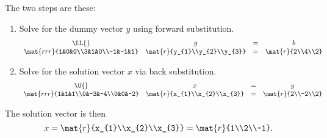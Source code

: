 The two steps are these:
\begin{enumerate}
\item Solve for the dummy vector $y$ using forward substitution.
\begin{equation}
  \begin{array}{cccc}
    \LL{}&y&=&b\\
    \mat{rrr}{1&0&0\\3&1&0\\-1&-1&1}&\mat{r}{y_{1}\\y_{2}\\y_{3}}&
    =&\mat{r}{2\\4\\2}
  \end{array}
\end{equation}
\item Solve for the solution vector $x$ via back substitution.
\begin{equation}
  \begin{array}{cccc}
    \U{}&x&=&y\\
    \mat{rrr}{1&1&1\\0&-3&-4\\0&0&-2}&\mat{r}{x_{1}\\x_{2}\\x_{3}}&
    =&\mat{r}{2\\-2\\2}
  \end{array}
\end{equation}
\end{enumerate}
The solution vector is then
\begin{equation}
  x = \mat{r}{x_{1}\\x_{2}\\x_{3}} = \mat{r}{1\\2\\-1}.
\end{equation}

\endinput